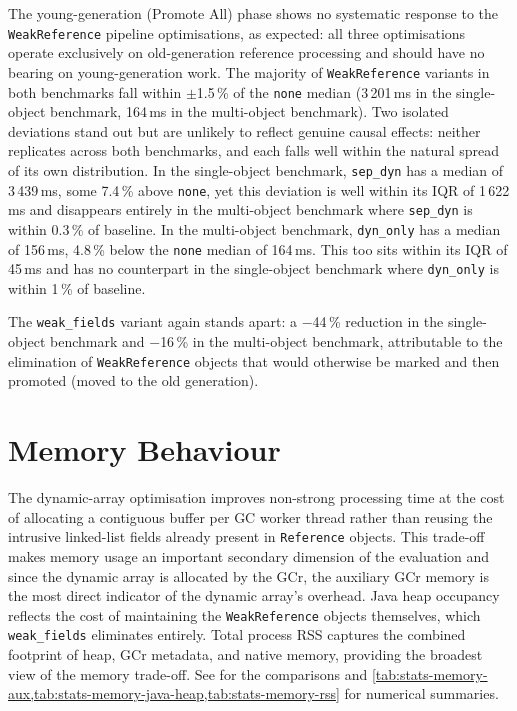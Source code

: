 The young-generation (Promote All) phase shows no systematic response to the \texttt{WeakReference} pipeline optimisations, as expected: all three optimisations operate exclusively on old-generation reference processing and should have no bearing on young-generation work. The majority of \texttt{WeakReference} variants in both benchmarks fall within $\pm$1.5\,\% of the \texttt{none} median (3\,201\,ms in the single-object benchmark, 164\,ms in the multi-object benchmark). Two isolated deviations stand out but are unlikely to reflect genuine causal effects: neither replicates across both benchmarks, and each falls well within the natural spread of its own distribution. In the single-object benchmark, \texttt{sep\_dyn} has a median of 3\,439\,ms, some 7.4\,\% above \texttt{none}, yet this deviation is well within its IQR of 1\,622\,ms and disappears entirely in the multi-object benchmark where \texttt{sep\_dyn} is within 0.3\,\% of baseline. In the multi-object benchmark, \texttt{dyn\_only} has a median of 156\,ms, 4.8\,\% below the \texttt{none} median of 164\,ms. This too sits within its IQR of 45\,ms and has no counterpart in the single-object benchmark where \texttt{dyn\_only} is within 1\,\% of baseline.

The \texttt{weak\_fields} variant again stands apart: a $-$44\,\% reduction in the single-object benchmark and $-$16\,\% in the multi-object benchmark, attributable to the elimination of \texttt{WeakReference} objects that would otherwise be marked and then promoted (moved to the old generation).

\section{Memory Behaviour}
\label{sec:analysis-memory}

The dynamic-array optimisation improves non-strong processing time at the cost of allocating a contiguous buffer per \ac{GC} worker thread rather than reusing the intrusive linked-list fields already present in \texttt{Reference} objects. This trade-off makes memory usage an important secondary dimension of the evaluation and since the dynamic array is allocated by the \ac{GCr}, the auxiliary \ac{GCr} memory is the most direct indicator of the dynamic array's overhead. Java heap occupancy reflects the cost of maintaining the \texttt{WeakReference} objects themselves, which \texttt{weak\_fields} eliminates entirely. Total process \ac{RSS} captures the combined footprint of heap, \ac{GCr} metadata, and native memory, providing the broadest view of the memory trade-off. See  for the comparisons and \cref{tab:stats-memory-aux,tab:stats-memory-java-heap,tab:stats-memory-rss} for numerical summaries.


